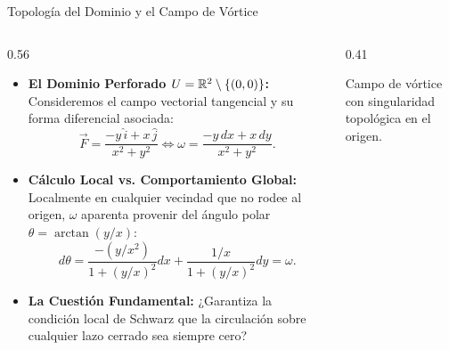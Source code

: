 \documentclass[10pt,aspectratio=169]{beamer}
\begin{document}
\begin{frame}{Topología del Dominio y el Campo de Vórtice}
  \begin{columns}[c]
    \begin{column}{0.56\textwidth}
      \footnotesize
      \begin{itemize}\itemsep2pt
        \item \textbf{El Dominio Perforado $U = \mathbb{R}^2 \setminus \{(0,0)\}$:}
        Consideremos el campo vectorial tangencial y su forma diferencial asociada:
        \[
        \vec{F} = \frac{-y\,\hat{i} + x\,\hat{j}}{x^2 + y^2} \iff \omega = \frac{-y\,dx + x\,dy}{x^2 + y^2}.
        \]
        \item \textbf{Cálculo Local vs. Comportamiento Global:}
        Localmente en cualquier vecindad que no rodee al origen, $\omega$ aparenta provenir del ángulo polar $\theta = \arctan(y/x)$:
        \[
        d\theta = \frac{-(y/x^2)}{1+(y/x)^2}dx + \frac{1/x}{1+(y/x)^2}dy = \omega.
        \]
        \item \textbf{La Cuestión Fundamental:}
        ¿Garantiza la condición local de Schwarz que la circulación sobre cualquier lazo cerrado sea siempre cero?
      \end{itemize}
    \end{column}
    \begin{column}{0.41\textwidth}
      \centering
      \vspace{0.1cm}
      {\scriptsize Campo de vórtice con singularidad topológica en el origen.}
    \end{column}
  \end{columns}
\end{frame}
\end{document}
